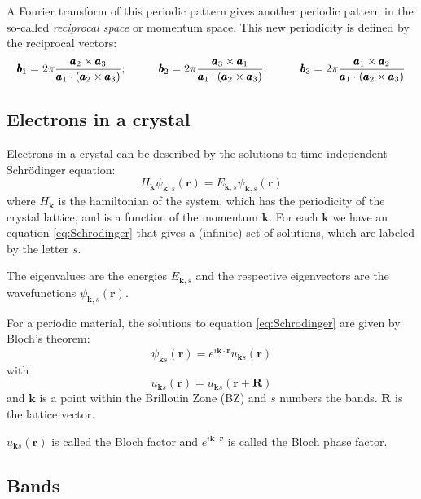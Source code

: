 \documentclass[a4paper,12pt]{report}
\begin{document}
A Fourier transform of this periodic pattern gives another periodic pattern in the so-called
\emph{reciprocal space} or momentum space.
This new periodicity is defined by the reciprocal vectors:
\begin{equation*}
 \pmb{b}_1 = 2\pi\dfrac{\pmb{a}_2\times\pmb{a}_3}{\pmb{a}_1\cdot (\pmb{a}_2\times\pmb{a}_3)};\hspace*{1cm}
 \pmb{b}_2 = 2\pi\dfrac{\pmb{a}_3\times\pmb{a}_1}{\pmb{a}_1\cdot (\pmb{a}_2\times\pmb{a}_3)};\hspace*{1cm}
 \pmb{b}_3 = 2\pi\dfrac{\pmb{a}_1\times\pmb{a}_2}{\pmb{a}_1\cdot (\pmb{a}_2\times\pmb{a}_3)}
\end{equation*}

\subsection*{Electrons in a crystal}

Electrons in a crystal can be described by the solutions to time independent Schr\"odinger equation:
\begin{equation}\label{eq:Schrodinger}
 H_{\pmb{k}}\psi_{\pmb{k},s}(\pmb{r}) = E_{\pmb{k},s}\psi_{\pmb{k},s}(\pmb{r})
\end{equation}
where $H_{\pmb{k}}$ is the hamiltonian of the system, which has the periodicity of the crystal lattice,
and is a function of the momentum $\pmb{k}$.
For each $\pmb{k}$ we have an equation \ref{eq:Schrodinger} that gives a (infinite) set of solutions,
which are labeled by the letter $s$.

The eigenvalues are the energies $E_{\pmb{k},s}$ and the respective eigenvectors are the wavefunctions
$\psi_{\pmb{k},s}(\pmb{r})$.

For a periodic material, the solutions to equation \ref{eq:Schrodinger} are given by Bloch's theorem:
\begin{equation}
 \psi_{\pmb{k}s}(\pmb{r}) = e^{i\pmb{k}\cdot\pmb{r}}u_{\pmb{k}s}(\pmb{r})
\end{equation}
with
\begin{equation}
 u_{\pmb{k}s}(\pmb{r}) = u_{\pmb{k}s}(\pmb{r} + \pmb{R})
\end{equation}
and $\pmb{k}$ is a point within the Brillouin Zone (BZ) and $s$ numbers the bands.
$\pmb{R}$ is the lattice vector.

$u_{\pmb{k}s}(\pmb{r})$ is called the Bloch factor and $e^{i\pmb{k}\cdot\pmb{r}}$
is called the Bloch phase factor.


\subsection*{Bands}
\end{document}
